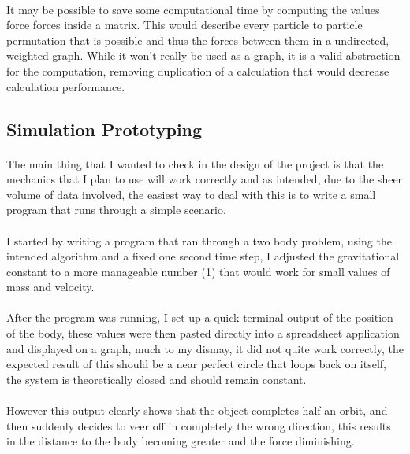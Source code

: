 \paragraph{}
It may be possible to save some computational time by computing the values force forces inside a matrix. This would describe every particle to particle permutation that is possible and thus the forces between them in a undirected, weighted graph. While it won't really be used as a graph, it is a valid abstraction for the computation, removing duplication of a calculation that would decrease calculation performance.

\subsection{Simulation Prototyping}
\paragraph{}
The main thing that I wanted to check in the design of the project is that the mechanics that I plan to use will work correctly and as intended, due to the sheer volume of data involved, the easiest way to deal with this is to write a small program that runs through a simple scenario.

\paragraph{}
I started by writing a program that ran through a two body problem, using the intended algorithm and a fixed one second time step, I adjusted the gravitational constant to a more manageable number (1) that would work for small values of mass and velocity. 

\paragraph{}
After the program was running, I set up a quick terminal output of the position of the body, these values were then pasted directly into a spreadsheet application and displayed on a graph, much to my dismay, it did not quite work correctly, the expected result of this should be a near perfect circle that loops back on itself, the system is theoretically closed and should remain constant.

\paragraph{}
However this output clearly shows that the object completes half an orbit, and then suddenly decides to veer off in completely the wrong direction, this results in the distance to the body becoming greater and the force diminishing.


